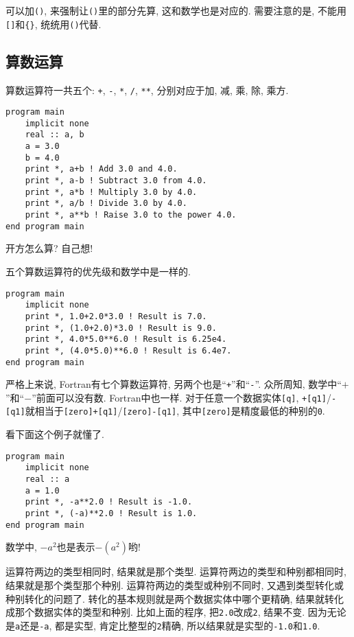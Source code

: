 可以加\verb|()|, 来强制让\verb|()|里的部分先算, 这和数学也是对应的. 需要注意的是, 不能用\verb|[]|和\verb|{}|, 统统用\verb|()|代替.

\subsection{算数运算}\label{fortran_numeric_operator}

算数运算符一共五个: \verb|+|, \verb|-|, \verb|*|, \verb|/|, \verb|**|, 分别对应于加, 减, 乘, 除, 乘方.
\begin{verbatim}
program main
    implicit none
    real :: a, b
    a = 3.0
    b = 4.0
    print *, a+b ! Add 3.0 and 4.0.
    print *, a-b ! Subtract 3.0 from 4.0.
    print *, a*b ! Multiply 3.0 by 4.0.
    print *, a/b ! Divide 3.0 by 4.0.
    print *, a**b ! Raise 3.0 to the power 4.0.
end program main
\end{verbatim}

开方怎么算? 自己想!

五个算数运算符的优先级和数学中是一样的.
\begin{verbatim}
program main
    implicit none
    print *, 1.0+2.0*3.0 ! Result is 7.0.
    print *, (1.0+2.0)*3.0 ! Result is 9.0.
    print *, 4.0*5.0**6.0 ! Result is 6.25e4.
    print *, (4.0*5.0)**6.0 ! Result is 6.4e7.
end program main
\end{verbatim}

严格上来说, Fortran有七个算数运算符, 另两个也是``\verb|+|''和``\verb|-|''. 众所周知, 数学中``$+$''和``$-$''前面可以没有数. Fortran中也一样. 对于任意一个数据实体\verb|[q]|, \verb|+[q1]|/\verb|-[q1]|就相当于\verb|[zero]+[q1]|/\verb|[zero]-[q1]|, 其中\verb|[zero]|是精度最低的种别的\verb|0|.

看下面这个例子就懂了.
\begin{verbatim}
program main
    implicit none
    real :: a
    a = 1.0
    print *, -a**2.0 ! Result is -1.0.
    print *, (-a)**2.0 ! Result is 1.0.
end program main
\end{verbatim}

数学中, $-a^2$也是表示$-(a^2)$哟!

运算符两边的类型相同时, 结果就是那个类型. 运算符两边的类型和种别都相同时, 结果就是那个类型那个种别. 运算符两边的类型或种别不同时, 又遇到类型转化或种别转化的问题了. 转化的基本规则就是两个数据实体中哪个更精确, 结果就转化成那个数据实体的类型和种别. 比如上面的程序, 把\verb|2.0|改成\verb|2|, 结果不变. 因为无论是\verb|a|还是\verb|-a|, 都是实型, 肯定比整型的\verb|2|精确, 所以结果就是实型的\verb|-1.0|和\verb|1.0|.

